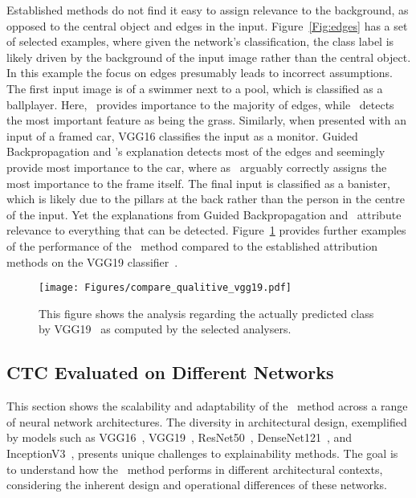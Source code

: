 Established methods do not find it easy to assign relevance to the background, as opposed to the central object and edges in the input. Figure~\ref{Fig:edges} has a set of selected examples, where given the network's classification, the class label is likely driven by the background of the input image rather than the central object. In this example the focus on edges presumably leads to incorrect assumptions. The first input image is of a swimmer next to a pool, which is classified as a ballplayer. Here, \LRP\ provides importance to the majority of edges, while \CTC\ detects the most important feature as being the grass. Similarly, when presented with an input of a framed car, VGG16 classifies the input as a monitor. Guided Backpropagation and \LRP's explanation detects most of the edges and seemingly provide most importance to the car, where as \CTC\ arguably correctly assigns the most importance to the frame itself. The final input is classified as a banister, which is likely due to the pillars at the back rather than the person in the centre of the input. Yet the explanations from Guided Backpropagation and \LRP\ attribute relevance to everything that can be detected. Figure~\ref{Fig:vgg19} provides further examples of the performance of the \CTC\ method compared to the established attribution methods on the VGG19 classifier~\cite{SimonyanZ14a}. 


\begin{figure}[ht!]
	\begin{center}
		\texttt{[image: Figures/compare\_qualitive\_vgg19.pdf]}
	\end{center}
	\caption{This figure shows the analysis regarding the actually predicted class by VGG19~\cite{SimonyanZ14a} as computed by the selected analysers.}
	\label{Fig:vgg19}
\end{figure} 

\subsection{CTC Evaluated on Different Networks}
This section shows the scalability and adaptability of the \CTC\ method across a range of neural network architectures. The diversity in architectural design, exemplified by models such as VGG16~\cite{SimonyanZ14a}, VGG19~\cite{SimonyanZ14a}, ResNet50~\cite{he2015deep}, DenseNet121~\cite{huang2018densely}, and InceptionV3~\cite{szegedy2015rethinking}, presents unique challenges to explainability methods. The goal is to understand how the \CTC\ method performs in different architectural contexts, considering the inherent design and operational differences of these networks. 

